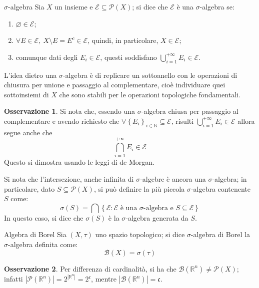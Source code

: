 \documentclass[11pt, a4paper]{scrartcl}
\theoremstyle{definition}
\numberwithin{esempio}{section}
\theoremstyle{definition}
\newtheorem{obs}{Osservazione}
\numberwithin{obs}{section}
\numberwithin{nota}{section}
\numberwithin{equation}{subsection}
\begin{document}
\begin{definizione}
	{$\sigma $-algebra}{}
	Sia $X$ un insieme e $\mathcal{E} \subseteq \mathcal{P} (X)$; si dice che $\mathcal{E} $ \`e una $\sigma$-algebra se:
	\begin{enumerate}[(s1).]
		\item $\varnothing \in \mathcal{E} $;
		\item $\forall E \in \mathcal{E} , \ X \setminus E=E^c \in \mathcal{E} $, quindi, in particolare, $X \in \mathcal{E} $;
		\item comunque dati degli $E_i \in \mathcal{E} $, questi soddisfano $\bigcup_{i=1} ^{+\infty} E_i \in \mathcal{E} $.
	\end{enumerate}
\end{definizione}
\noindent L'idea dietro una $\sigma $-algebra \`e di replicare un sottoanello con le operazioni di chiusura per unione e passaggio al complementare, cio\`e individuare quei sottoinsiemi di $X$ che sono stabili per le operazioni topologiche fondamentali.
\begin{obs}
	Si nota che, essendo una $\sigma $-algebra chiusa per passaggio al complementare e avendo richiesto che $\forall \left\{ E_i \right\} _{i \in \mathbb{N}} \subseteq \mathcal{E} $, risulti $\bigcup_{i=1} ^{+\infty} E_i \in \mathcal{E} $ allora segue anche che 
	\begin{equation}
		\bigcap_{i=1} ^{+\infty} E_i \in \mathcal{E} 
	\end{equation}
	Questo si dimostra usando le leggi di de Morgan.
\end{obs}
\noindent Si nota che l'intersezione, anche infinita di $\sigma $-algebre \`e ancora una $\sigma $-algebra; in particolare, dato $S \subseteq \mathcal{P} (X)$, si pu\`o definire la pi\`u piccola $\sigma $-algebra contenente $S$ come:
\begin{equation}
	\sigma (S) = \bigcap \left\{ \mathcal{E} : \mathcal{E} \text{ \`e una } \sigma\text{-algebra e } S \subseteq \mathcal{E} \right\} 
\end{equation}
In questo caso, si dice che $\sigma (S)$ \`e la $\sigma $-algebra generata da $S$.
\begin{definizione}
	{Algebra di Borel}{}
	Sia $(X,\tau )$ uno spazio topologico; si dice $\sigma $-algebra di Borel la $\sigma $-algebra definita come:
	\begin{equation*}
		\mathcal{B} (X) = \sigma (\tau )
	\end{equation*}
\end{definizione}
\begin{obs}
Per differenza di cardinalit\`a, si ha che $\mathcal{B} (\mathbb{R}^n)\neq \mathcal{P} (X)$; infatti $|\mathcal{P} (\mathbb{R}^n)| = 2 ^{|\mathbb{R}^n|} = 2 ^{\mathfrak{c}} $, mentre $|\mathcal{B} (\mathbb{R}^n)| = \mathfrak{c}$.
\end{obs}
\end{document}
